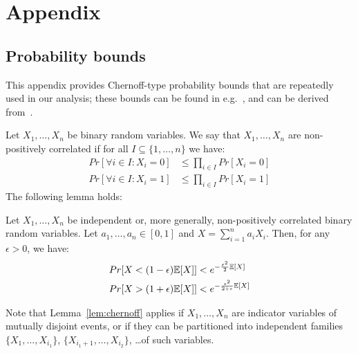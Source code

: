 \section{Appendix}
\label{sec:apx}

\subsection{Probability bounds}
\label{apx:chernoff_bounds}
This appendix provides Chernoff-type probability bounds that are repeatedly used in our analysis; these bounds can be found in e.g.~\cite{Auger&2011}, and can be derived from~\cite{Panconesi&1997}.

Let $X_1,\ldots,X_n$ be binary random variables. We say that $X_1,\ldots,X_n$ are non-positively correlated if for all $I \subseteq \{1,\ldots,n\}$ we have:
\begin{align}
Pr[\forall i \in I: X_i=0] &\leq \prod_{i \in I} Pr[X_i=0] \\
Pr[\forall i \in I: X_i=1] &\leq \prod_{i \in I} Pr[X_i=1]
\end{align}
The following lemma holds:
\begin{lemma}
\label{lem:chernoff}
Let $X_1,\ldots,X_n$ be independent or, more generally, non-positively correlated binary random variables. Let $a_1,\ldots,a_n \in [0,1]$ and $X=\sum_{i=1}^{n}a_i X_i$. Then, for any $\epsilon > 0$, we have:
\begin{align}
Pr[X < (1-\epsilon)\mathbb{E}[X]] &< e^{-\frac{\epsilon^2}{2}\mathbb{E}[X]} \\
Pr[X > (1+\epsilon)\mathbb{E}[X]] &< e^{-\frac{\epsilon^2}{2+\epsilon}\mathbb{E}[X]} 
\end{align}
\end{lemma}
Note that Lemma~\ref{lem:chernoff} applies if $X_1,\ldots,X_n$ are indicator variables of mutually disjoint events, or if they can be partitioned into independent families $\{X_1,\ldots,X_{i_1}\}$, $\{X_{i_1+1},\ldots,X_{i_2}\}$, \ldots of such variables. 

